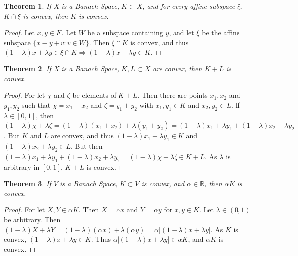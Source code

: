 \documentclass[oneside]{book}
\theoremstyle{mystyle}
\newtheorem{theorem}{Theorem}[section]
\begin{document}
\begin{theorem}
If $X$ is a Banach Space, $K\subset X$, and for every affine subspace $\xi$, $K\cap \xi$ is convex, then $K$ is convex.
\end{theorem}
\begin{proof}
Let $x,y\in K$. Let $W$ be a subspace containing $y$, and let $\xi$ be the affine subspace $\{x-y+v:v\in W\}$. Then $\xi\cap K$ is convex, and thus $(1-\lambda)x+\lambda y \in \xi \cap K \Rightarrow (1-\lambda)x+\lambda y \in K$.
\end{proof}

\begin{theorem}
If $X$ is a Banach Space, $K,L\subset X$ are convex, then $K+L$ is convex.
\end{theorem}
\begin{proof}
For let $\chi$ and $\zeta$ be elements of $K+L$. Then there are points $x_1,x_2$ and $y_1,y_2$ such that $\chi=x_1+x_2$ and $\zeta = y_1+y_2$ with $x_1,y_1\in K$ and $x_2,y_2\in L$. If $\lambda \in [0,1]$, then $(1-\lambda)\chi + \lambda \zeta = (1-\lambda)(x_1+x_2)+\lambda(y_1+y_2) = (1-\lambda)x_1 + \lambda y_1 + (1-\lambda)x_2 + \lambda y_2$. But $K$ and $L$ are convex, and thus $(1-\lambda)x_1 + \lambda y_1 \in K$ and $(1-\lambda)x_2 + \lambda y_2 \in L$. But then $(1-\lambda)x_1 + \lambda y_1 + (1-\lambda)x_2 + \lambda y_2=(1-\lambda)\chi + \lambda \zeta\in K+L$. As $\lambda$ is arbitrary in $[0,1]$, $K+L$ is convex.
\end{proof}

\begin{theorem}
If $V$ is a Banach Space, $K\subset V$ is convex, and $\alpha \in \mathbb{R}$, then $\alpha K$ is convex.
\end{theorem}
\begin{proof}
For let $X,Y\in \alpha K$. Then $X = \alpha x$ and $Y = \alpha y$ for $x,y\in K$. Let $\lambda \in (0,1)$ be arbitrary. Then $(1-\lambda)X+\lambda Y =(1-\lambda)(\alpha x)+\lambda (\alpha y) = \alpha\big[(1-\lambda)x+\lambda y\big]$. As $K$ is convex, $(1-\lambda)x+\lambda y \in K$. Thus $\alpha\big[(1-\lambda)x+\lambda y\big] \in \alpha K$, and $\alpha K$ is convex.
\end{proof}
\end{document}
